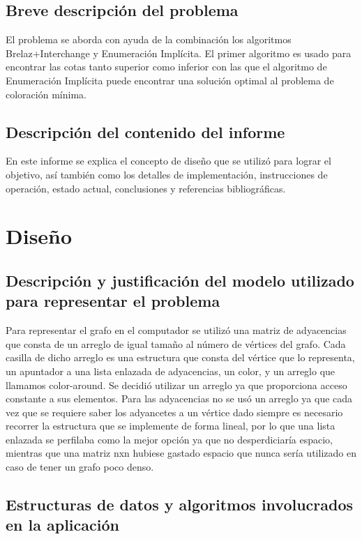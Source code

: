 \documentclass[a4paper,10pt]{article}
\begin{document}
\subsection{Breve descripción del problema}
El problema se aborda con ayuda de la combinación los algoritmos 
Brelaz+Interchange y Enumeración Implícita. El primer algoritmo es 
usado para encontrar las cotas tanto superior como inferior con las que 
el algoritmo de Enumeración Implícita puede encontrar una solución optimal
al problema de coloración mínima. 

\subsection{Descripción del contenido del informe}
En este informe se explica el concepto de diseño que se utilizó
para lograr el objetivo, así también como los detalles de implementación, 
instrucciones de operación, estado actual, conclusiones y referencias bibliográficas.

\section{Diseño}

\subsection{Descripción y justificación del modelo utilizado para representar el problema}
Para representar el grafo en el computador se utilizó una matriz de adyacencias que consta 
de un arreglo de igual tamaño al número de vértices del grafo. Cada casilla de dicho arreglo es 
una estructura que consta del vértice que lo representa, un apuntador a una lista enlazada de adyacencias, 
un color, y un arreglo que llamamos color-around. Se decidió utilizar un arreglo ya que proporciona acceso 
constante a sus elementos. Para las adyacencias no se usó un arreglo ya que cada vez que se requiere saber los 
adyancetes a un vértice dado siempre es necesario recorrer la estructura que se implemente de forma lineal, por lo que 
una lista enlazada se perfilaba como la mejor opción ya que no desperdiciaría espacio, mientras que una matriz nxn 
hubiese gastado espacio que nunca sería utilizado en caso de tener un grafo poco denso. 

\subsection{Estructuras de datos y algoritmos involucrados en la aplicación}
\end{document}
